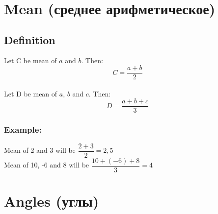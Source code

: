 \documentclass[a4paper]{article}
\begin{document}
\begin{Large}

\section*{Mean (среднее арифметическое)}

\subsection*{Definition}

Let C be mean of $a$ and $b$. Then: \\[0.075cm]

\[C = \dfrac{a+b}{2}\] \\[0.075cm]

\noindent Let D be mean of $a$, $b$ and $c$. Then:  \\[0.075cm]

\[D = \dfrac{a+b+c}{3}\] 

\subsubsection*{Example:}

Mean of 2 and 3 will be $\dfrac{2+3}{2} = 2,5$ \\[0.075cm]

\noindent Mean of 10, -6 and 8 will be $\dfrac{10+(-6)+8}{3} = 4$

\section*{Angles (углы)}


\begin{tikzpicture}[scale=2]


\end{tikzpicture}


\end{Large}
\end{document}
